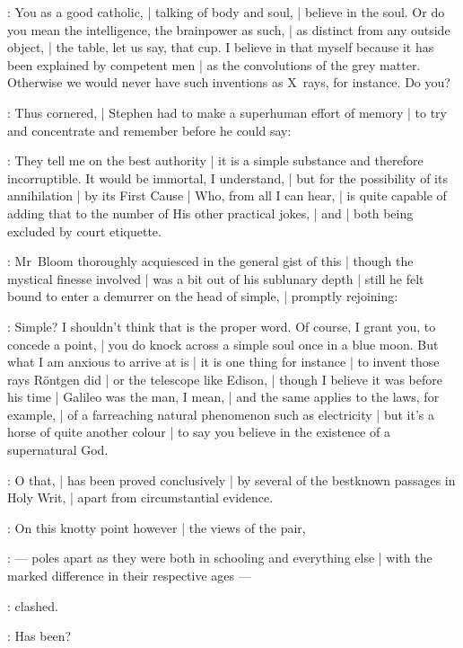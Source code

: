 \Bloom:
You as a good catholic, |
talking of body and soul, |
believe in the soul.
Or do you mean the intelligence, the brainpower as such, |
as distinct from any outside object, |
the table, let us say, that cup.
I believe in that myself because it has been explained by competent men |
as the convolutions of the grey matter.
Otherwise we would never have such inventions as X~rays, for instance.
Do you?

:
Thus cornered, |
Stephen had to make a superhuman effort of memory |
to try and concentrate and remember before he could say:

\Stephen:
They tell me on the best authority |
it is a simple substance and therefore incorruptible.
It would be immortal, I understand, |
but for the possibility of its annihilation |
by its First Cause |
Who, from all I can hear, |
is quite capable of adding that to the number of His other practical jokes, |
 and  |
both being excluded by court etiquette.

:
Mr~Bloom thoroughly acquiesced in the general gist of this |
though the mystical finesse involved |
was a bit out of his sublunary depth |
still he felt bound to enter a demurrer on the head of simple, |
promptly rejoining:

\Bloom:
Simple? I shouldn't think that is the proper word.
Of course, I grant you, to concede a point, |
you do knock across a simple soul once in a blue moon.
But what I am anxious to arrive at is |
it is one thing for instance |
to invent those rays Röntgen did |
or the telescope like Edison, |
though I believe it was before his time |
Galileo was the man, I mean, |
and the same applies to the laws, for example, |
of a farreaching natural phenomenon such as electricity |
but it's a horse of quite another colour |
to say you believe in the existence of a supernatural God.

\Stephen:
O that, |
has been proved conclusively |
by several of the bestknown passages in Holy Writ, |
apart from circumstantial evidence.

:
On this knotty point however |
the views of the pair,

:
    --- poles apart as they were both in schooling and everything else |
        with the marked difference in their respective ages ---

:
clashed.

\Bloom:
Has been?

